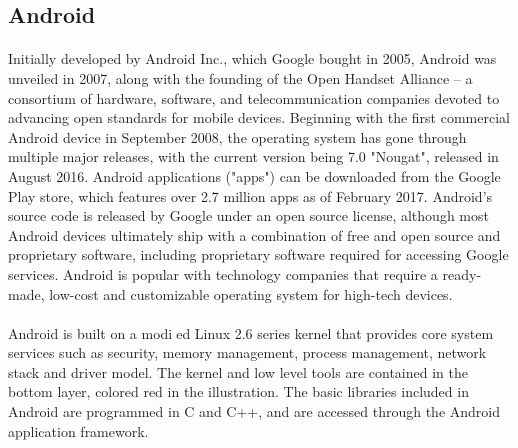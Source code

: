 \subsection{Android}


\paragraph{}
Initially developed by Android Inc., which Google bought in 2005, Android was unveiled in 2007, along with the founding of the Open Handset Alliance – a consortium of hardware, software, and telecommunication companies devoted to advancing open standards for mobile devices.
Beginning with the first commercial Android device in September 2008, the operating system has gone through multiple major releases, with the current version being 7.0 "Nougat", released in August 2016.
Android applications ("apps") can be downloaded from the Google Play store, which features over 2.7 million apps as of February 2017.
Android's source code is released by Google under an open source license, although most Android devices ultimately ship with a combination of free and open source and proprietary software, including proprietary software required for accessing Google services.
Android is popular with technology companies that require a ready-made, low-cost and customizable operating system for high-tech devices.

\paragraph{}
Android is built on a modied Linux 2.6 series kernel that provides core system services such as security, memory management, process management, network stack and driver model. The kernel and low level tools are contained in the
bottom layer, colored red in the illustration. The basic libraries included in Android are programmed in C and C++, and are accessed through the
Android application framework.




\paragraph{}

